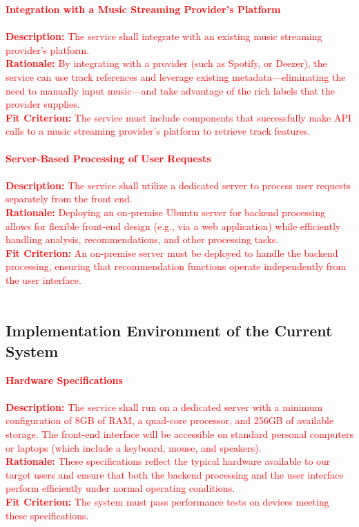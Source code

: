 \documentclass[12pt]{article}
\begin{document}
\begin{itemize}
  \textcolor{red}{\textbf{Integration with a Music Streaming Provider’s Platform}} \\
  \\ \textcolor{red}{\textbf{Description:} The service shall integrate with an existing music streaming provider’s platform.}
  \\ \textcolor{red}{\textbf{Rationale:} By integrating with a provider (such as Spotify, or Deezer), the service can use track references and 
  leverage existing metadata—eliminating the need to manually input music—and take advantage of the rich labels that 
  the provider supplies.}
  \\ \textcolor{red}{\textbf{Fit Criterion:} The service must include components that successfully make API calls to a music streaming 
  provider’s platform to retrieve track features.}
  \\ \\

  \textcolor{red}{\textbf{Server-Based Processing of User Requests}} \\
  \\ \textcolor{red}{\textbf{Description:} The service shall utilize a dedicated server to process user requests separately from the front end.}
  \\ \textcolor{red}{\textbf{Rationale:} Deploying an on-premise Ubuntu server for backend processing allows for flexible front-end design 
  (e.g., via a web application) while efficiently handling analysis, recommendations, and other processing tasks.}
  \\ \textcolor{red}{\textbf{Fit Criterion:} An on-premise server must be deployed to handle the backend processing, ensuring that 
  recommendation functions operate independently from the user interface.}
  \\ \\
\end{itemize}

\subsection{Implementation Environment of the Current System}

\textcolor{red}{\textbf{Hardware Specifications}} \\
\\ \textcolor{red}{\textbf{Description:} The service shall run on a dedicated server with a minimum configuration of 8GB of RAM, 
a quad-core processor, and 256GB of available storage. The front-end interface will be accessible on standard personal 
computers or laptops (which include a keyboard, mouse, and speakers).}
\\ \textcolor{red}{\textbf{Rationale:} These specifications reflect the typical hardware available to our target users and 
ensure that both the backend processing and the user interface perform efficiently under normal operating conditions.}
\\ \textcolor{red}{\textbf{Fit Criterion:} The system must pass performance tests on devices meeting these specifications.}
\\ \\
\end{document}

